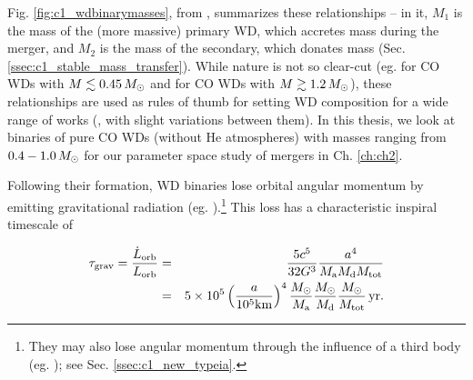 Fig. \ref{fig:c1_wdbinarymasses}, from \cite{dan+12}, summarizes these relationships -- in it, $M_1$ is the mass of the (more massive) primary WD, which accretes mass during the merger, and $M_2$ is the mass of the secondary, which donates mass (Sec. \ref{ssec:c1_stable_mass_transfer}).  While nature is not so clear-cut (eg. \citealt{ibent85, moros09} for CO WDs with $M\lesssim0.45\,\Msun$ and \citealt{hurlpt00} for CO WDs with $M\gtrsim1.2\,\Msun$), these relationships are used as rules of thumb for setting WD composition for a wide range of works (\citealt{loreig09,rask+12,dan+12,dan+14}, with slight variations between them).  In this thesis, we look at binaries of pure CO WDs (without He atmospheres) with masses ranging from $0.4 - 1.0\,\Msun$ for our parameter space study of mergers in Ch. \ref{ch:ch2}.  





Following their formation, WD binaries lose orbital angular momentum by emitting gravitational radiation (eg. \citealt{petem63}).\footnote{They may also lose angular momentum through the influence of a third body (eg. \citealt{katzd12}); see Sec. \ref{ssec:c1_new_typeia}.}  This loss has a characteristic inspiral timescale of \citep{segrcm97}

\begin{eqnarray}
\tau_{\mrm{grav}} = \frac{\dot{L}_\mrm{orb}}{L_\mrm{orb}} &=& \frac{5c^5}{32G^3}\frac{a^4}{\Ma\Md\Mtot}\nonumber \\
&=&5 \times 10^5 \left(\frac{a}{10^5 \mrm{km}}\right)^4 \frac{\Msun}{\Ma} \frac{\Msun}{\Md} \frac{\Msun}{\Mtot}\,\mrm{yr}.
\label{eq:c1_gravtimescale}
\end{eqnarray}

